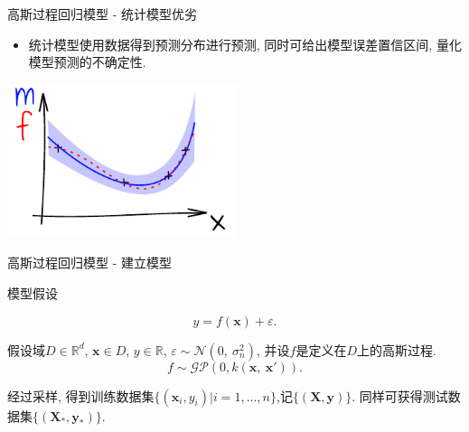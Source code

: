 \documentclass[10pt,mathserif]{beamer}
\theoremstyle{definition}
\numberwithin{equation}{section} %
\begin{document}
    \begin{frame}{高斯过程回归模型 - 统计模型优劣}
        \begin{itemize}
            \item 统计模型使用数据得到预测分布进行预测, 同时可给出模型误差置信区间, 量化模型预测的不确定性.
        \end{itemize}

        \begin{center}
            \includegraphics[height=4.5cm]{fig/ink_mconfint}
        \end{center}
    \end{frame}

    \begin{frame}[fragile]{高斯过程回归模型 - 建立模型}

        模型假设
        
        $$y=f(\boldsymbol{x})+\varepsilon.$$

        假设域$D\in\mathds{R}^{d}$, $\boldsymbol{x}\in D$, $y\in\mathds{R}$, $\varepsilon\sim\mathcal{N}(0,\ \sigma^{2}_{n})$, 并设$f$是定义在$D$上的高斯过程.
            $$f\sim\mathcal{GP}\left(0, k(\boldsymbol{x},\ \boldsymbol{x}')\right).$$

        经过采样, 得到训练数据集$\{(\boldsymbol{x}_{i},y_{i})|i=1,\dots,n\}$,记$\{(\boldsymbol{X}, \boldsymbol{y})\}$. 同样可获得测试数据集$\{(\boldsymbol{X}_{*}, \boldsymbol{y}_{*})\}$.
    \end{frame}
\end{document}
